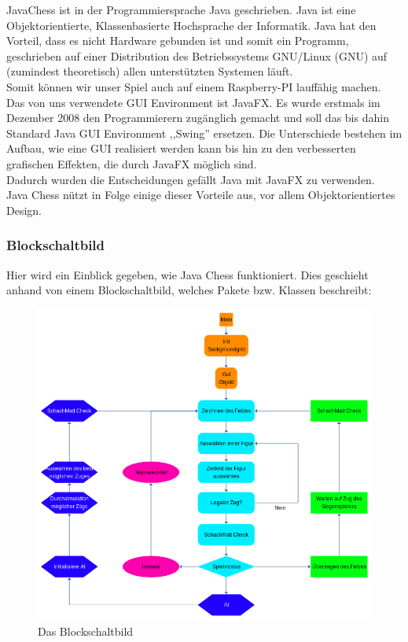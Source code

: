 \documentclass[12pt,a4paper]{article}
\begin{document}
{JavaChess ist in der Programmiersprache Java geschrieben. Java ist eine Objektorientierte, Klassenbasierte Hochsprache der Informatik. Java hat den Vorteil, dass es nicht Hardware gebunden ist und somit ein Programm, geschrieben auf einer Distribution des Betriebssystems GNU/Linux (\ac{GNU}) auf (zumindest theoretisch) allen unterstützten Systemen läuft. \\
Somit können wir unser Spiel auch auf einem Raspberry-PI lauffähig machen. \\
Das von uns verwendete \ac{GUI} Environment ist JavaFX. Es wurde erstmals im Dezember 2008 den Programmierern zugänglich gemacht und soll das bis dahin Standard Java GUI Environment ,,Swing'' ersetzen. Die Unterschiede bestehen im Aufbau, wie eine GUI realisiert werden kann bis hin zu den verbesserten grafischen Effekten, die durch JavaFX möglich sind. \\[1ex]
Dadurch wurden die Entscheidungen gefällt Java mit JavaFX zu verwenden.\\
Java Chess nützt in Folge einige dieser Vorteile aus, vor allem Objektorientiertes Design. 


\subsubsection{Blockschaltbild}
\label{SUBSUBSEC:BLOCKSCHALTBILD}

Hier wird ein Einblick gegeben, wie Java Chess funktioniert. Dies geschieht anhand von einem Blockschaltbild, welches Pakete bzw. Klassen beschreibt: \\
\vspace{1cm}


\begin{figure}[H]
  \centering
   	\includegraphics[width=14cm]{graphics/block.png}
  \caption{Das Blockschaltbild}
  \label{fig:block}
\end{figure}

}
\end{document}
